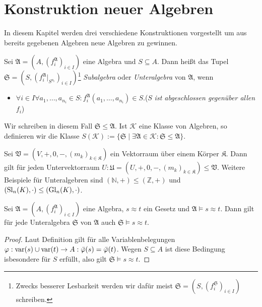 \section{Konstruktion neuer Algebren}

In diesem Kapitel werden drei verschiedene Konstruktionen vorgestellt um aus bereits gegebenen Algebren neue Algebren zu gewinnen.

\begin{definition}
    Sei $\mathfrak{A}=(A,(f^\mathfrak{A}_i)_{i\in I})$ eine Algebra und $S\subseteq A$. Dann heißt das Tupel $\mathfrak{S}=(S,(f^\mathfrak{A}_i|_{S^{n_i}})_{i\in I})$\footnote{Zwecks besserer Lesbarkeit werden wir dafür meist $\mathfrak{S}=(S,(f^\mathfrak{S}_i)_{i\in I})$ schreiben.}
    \emph{Subalgebra} oder \emph{Unteralgebra} von $\mathfrak{A}$, wenn
    \begin{itemize}[topsep=0pt, label={--}]
        \item $\forall i\in I\forall a_1,\ldots,a_{n_i}\in S:f^\mathfrak{A}_i(a_1,\ldots,a_{n_i})\in S.$\tab ($S$ \emph{ist abgeschlossen gegenüber allen} $f_i$)
    \end{itemize}
    Wir schreiben in diesem Fall $\mathfrak{S}\le \mathfrak{A}$. Ist $\mathcal{K}$ eine Klasse von Algebren,
    so definieren wir die Klasse $S(\mathcal{K}):=\{\mathfrak{S} \mid \exists \mathfrak{A}\in \mathcal{K}:\mathfrak{S}\le\mathfrak{A}\}$.
\end{definition}

\begin{example}
    Sei $\mathfrak{V}=(V,+,0,-,(m_k)_{k\in\mathfrak{K}})$ ein Vektorraum über einem Körper $\mathfrak{K}$. Dann gilt für
    jeden Untervektorraum $U:\mathfrak{U}=(U,+,0,-,(m_k)_{k\in\mathfrak{K}})\le \mathfrak{V}$. Weitere
    Beispiele für Unteralgebren sind $(\mathbb{N},+)\le(\mathbb{Z},+)$ und $(\operatorname{Sl}_n(K),\cdot)\le (\operatorname{Gl}_n(K),\cdot)$.
\end{example}

\begin{proposition}\label{prop:unteralgebra}
    Sei $\mathfrak{A}=(A,(f^\mathfrak{A}_i)_{i\in I})$ eine Algebra, $s\approx t$ ein Gesetz und $\mathfrak{A}\models s\approx t$.
    Dann gilt für jede Unteralgebra $\mathfrak{S}$ von $\mathfrak{A}$ auch $\mathfrak{S}\models s\approx t$.
\end{proposition}

\begin{proof}
    Laut Definition gilt für alle Variablenbelegungen $\varphi:\operatorname{var}(s)\cup \operatorname{var}(t)\to A:\bar{\varphi}(s)=\bar{\varphi}(t)$.
    Wegen $S\subseteq A$ ist diese Bedingung isbesondere für $S$ erfüllt, also gilt $\mathfrak{S}\models s\approx t$.
\end{proof}

